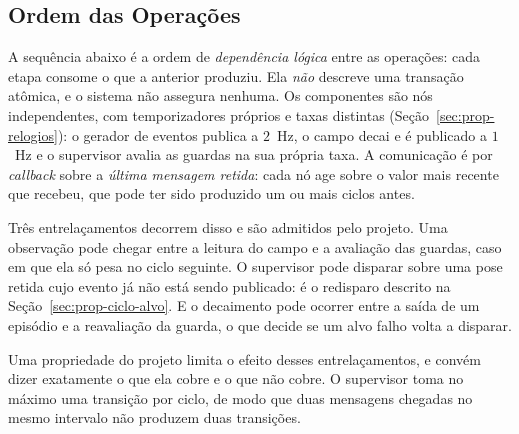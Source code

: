 \subsection{Ordem das Operações}

A sequência abaixo é a ordem de \emph{dependência lógica} entre as operações: cada
etapa consome o que a anterior produziu. Ela \emph{não} descreve uma transação atômica,
e o sistema não assegura nenhuma. Os componentes são nós independentes, com
temporizadores próprios e taxas distintas (Seção~\ref{sec:prop-relogios}): o gerador de
eventos publica a $2$~Hz, o campo decai e é publicado a $1$~Hz e o supervisor avalia as
guardas na sua própria taxa. A comunicação é por \textit{callback} sobre a
\emph{última mensagem retida}: cada nó age sobre o valor mais recente que recebeu, que
pode ter sido produzido um ou mais ciclos antes.

Três entrelaçamentos decorrem disso e são admitidos pelo projeto. Uma observação pode
chegar entre a leitura do campo e a avaliação das guardas, caso em que ela só pesa no
ciclo seguinte. O supervisor pode disparar sobre uma pose retida cujo evento já não
está sendo publicado: é o redisparo descrito na Seção~\ref{sec:prop-ciclo-alvo}. E o
decaimento pode ocorrer entre a saída de um episódio e a reavaliação da guarda, o que
decide se um alvo falho volta a disparar.

Uma propriedade do projeto limita o efeito desses entrelaçamentos, e convém dizer
exatamente o que ela cobre e o que não cobre. O supervisor toma no máximo uma transição
por ciclo, de modo que duas mensagens chegadas no mesmo intervalo não produzem duas
transições.

